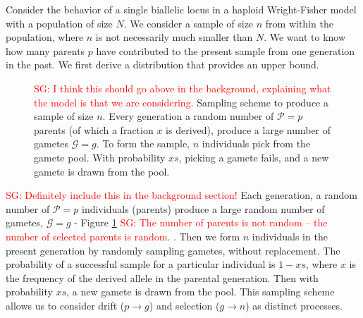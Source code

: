 \documentclass[review]{elsarticle}
\newcommand{\drawcirclerow}[5][0] { %
  \FPadd\stop#2#1
  \foreach \i in {#1,...,\stop} {
    \ifnum \i < \stop
    \fill[#3] (\i, #4) circle (#5);
    \draw (\i, #4) circle (#5); 
    \fi
  }
}
\newcommand{\sgcomment}[1]{\textcolor{red}{SG: #1}}
\begin{document}
Consider the behavior of a single biallelic locus in a haploid Wright-Fisher model with a population
of size $N$. We consider a sample of size $n$ from within the population, where $n$ is not
necessarily much smaller than $N$. We want to know how many parents $p$ have contributed to the
present sample from one generation in the past. We first derive a distribution that provides an
upper bound.

\begin{figure}
  \centering
    \caption{\sgcomment{I think this should go above in the background, explaining what the model is that we are considering. }Sampling scheme to produce a sample of size $n$. Every generation a random number of
      $\mathcal{P}=p$ parents (of which a fraction $x$ is derived), produce a large number of
      gametes $\mathcal{G}=g$. To form the sample, $n$ individuals pick from the gamete pool. With
      probability $xs$, picking a gamete fails, and a new gamete is drawn from the pool.}
    \label{fig:sampling}
\end{figure}

\sgcomment{Definitely include this in the background section!} Each generation, a random number of $\mathcal{P}=p$ individuals (parents) produce a large random
number of gametes, $\mathcal{G}=g$ - Figure \ref{fig:sampling} \sgcomment{The number of parents is not random -- the number of selected parents is random. }. Then we form $n$ individuals in the present
generation by randomly sampling gametes, without replacement. The probability of a successful sample
for a particular individual is $1-xs$, where $x$ is the frequency of the derived allele in the
parental generation. Then with probability $xs$, a new gamete is drawn from the pool. This sampling
scheme allows us to consider drift ($p \rightarrow g$) and selection ($g \rightarrow n$) as distinct
processes.
\end{document}
